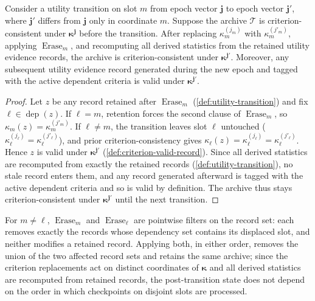 \begin{proposition}
\label{prop:erasure-stationarity}
Consider a utility transition on slot \(m\) from epoch vector \(\boldsymbol{j}\) to epoch vector
\(\boldsymbol{j}'\), where \(\boldsymbol{j}'\) differs from \(\boldsymbol{j}\) only in coordinate \(m\). Suppose the
archive \(\mathcal T\) is criterion-consistent under
\(\boldsymbol{\kappa}^{\boldsymbol{j}}\) before the transition. After replacing
\(\kappa_m^{(j_m)}\) with \(\kappa_m^{(j'_m)}\), applying \(\operatorname{Erase}_m\), and recomputing all
derived statistics from the retained utility evidence records, the archive is criterion-consistent under
\(\boldsymbol{\kappa}^{\boldsymbol{j}'}\). Moreover, any subsequent utility evidence record generated during
the new epoch and tagged with the active dependent criteria is valid under
\(\boldsymbol{\kappa}^{\boldsymbol{j}'}\).
\end{proposition}

\begin{proof}
Let \(z\) be any record retained after \(\operatorname{Erase}_m\) (\cref{def:utility-transition}) and fix
\(\ell\in\operatorname{dep}(z)\). If \(\ell=m\), retention forces the second clause of
\(\operatorname{Erase}_m\), so \(\kappa_m(z)=\kappa_m^{(j'_m)}\). If \(\ell\neq m\), the transition leaves
slot \(\ell\) untouched (\(\kappa_\ell^{(j_\ell)}=\kappa_\ell^{(j'_\ell)}\)), and prior
criterion-consistency gives \(\kappa_\ell(z)=\kappa_\ell^{(j_\ell)}=\kappa_\ell^{(j'_\ell)}\). Hence
\(z\) is valid under \(\boldsymbol{\kappa}^{\boldsymbol{j}'}\) (\cref{def:criterion-valid-record}). Since
all derived statistics are recomputed from exactly the retained records (\cref{def:utility-transition}),
no stale record enters them, and any record generated afterward is tagged with the active dependent
criteria and so is valid by definition. The archive thus stays criterion-consistent under
\(\boldsymbol{\kappa}^{\boldsymbol{j}'}\) until the next transition.
\end{proof}

\begin{remark}
\label{rem:erasure-commute}
For \(m\neq \ell\), \(\operatorname{Erase}_m\) and \(\operatorname{Erase}_\ell\) are pointwise filters on the record set: each removes exactly the records whose dependency set contains its displaced slot, and neither modifies a retained record. Applying both, in either order, removes the union of the two affected record sets and retains the same archive; since the criterion replacements act on distinct coordinates of \(\boldsymbol{\kappa}\) and all derived statistics are recomputed from retained records, the post-transition state does not depend on the order in which checkpoints on disjoint slots are processed.
\end{remark}

